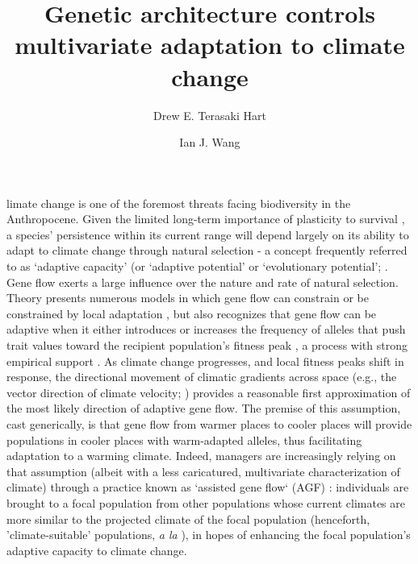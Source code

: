 \documentclass[9pt,twocolumn,twoside,lineno]{pnas-new}
\title{Genetic architecture controls multivariate adaptation to climate change}
\author[a,1]{Drew E. Terasaki Hart}
\author[a]{Ian J. Wang}
\affil[a]{Department of Environmental Science, Policy, and Management, University of California, Berkeley, CA 94720}
\begin{document}
\maketitle
\thispagestyle{firststyle}

limate change is one of the foremost threats facing biodiversity in the Anthropocene.
Given the limited long-term importance of plasticity to survival \cite{chevin},
a species’ persistence within its current range will depend largely on its ability to
adapt to climate change through natural selection - a concept frequently referred to 
as `adaptive capacity’ (or `adaptive potential’ or `evolutionary potential’; 
\cite{chevin,harrisson,nicotra,vilas,wade}.
Gene flow exerts a large influence over the nature and rate of natural selection. 
Theory presents numerous models
in which gene flow can constrain or be constrained by
local adaptation \cite{wang,lenormand,slatkin,haldane,wright,felsenstein},
but also recognizes that gene flow can be adaptive when it 
either introduces or increases the frequency of alleles 
that push trait values toward
the recipient population's fitness peak \cite{aitken_whitlock,slatkin,tigano},
a process with strong empirical support \cite{feder}. 
As climate change progresses,
and local fitness peaks shift in response, 
the directional movement of climatic gradients across space (e.g., the vector
direction of climate velocity; \cite{ackerly}) provides a reasonable first 
approximation of the most likely direction of adaptive gene flow. The premise of this 
assumption, cast generically, is that gene flow from warmer places to 
cooler places will provide populations in cooler places with warm-adapted alleles,
thus facilitating adaptation to a warming climate. 
Indeed, managers are increasingly relying on that assumption
(albeit with a less caricatured, multivariate characterization of climate)
through a practice known as `assisted gene flow` (AGF) \cite{aitken_whitlock}:
individuals are brought to a focal population
from other populations whose current 
climates are more similar to the projected climate of the focal population
(henceforth, 'climate-suitable' populations, \textit{a la} \cite{bellis}),
in hopes of enhancing the focal population's adaptive capacity to climate change.
\end{document}

